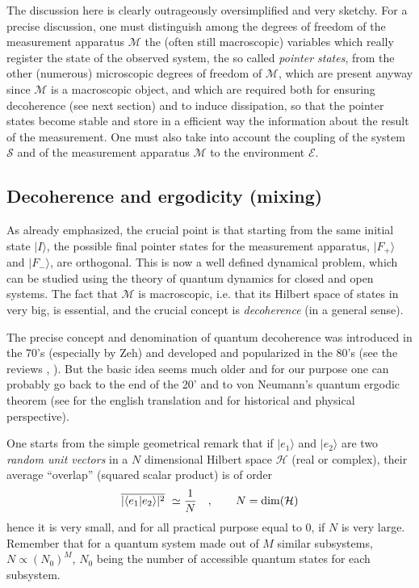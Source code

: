 The discussion here is clearly outrageously oversimplified and very sketchy. For a  precise discussion, one must distinguish among the degrees of freedom of the measurement apparatus $\mathcal{M}$ the (often still macroscopic) variables which really register the state of the observed system, the so called\emph{ pointer states}, from the other (numerous) microscopic degrees of freedom of $\mathcal{M}$, which are present anyway since $\mathcal{M}$ is a macroscopic object, and which are required both for ensuring decoherence (see next section) and to induce dissipation, so that the pointer states become stable and store in a efficient way the information about the result of the measurement. One must also take into account the coupling of the system $\mathcal{S}$ and of the measurement apparatus $\mathcal{M}$ to the environment $\mathcal{E}$.

\subsection{Decoherence and ergodicity (mixing)}
As already emphasized, the crucial point is that starting from the same initial state $|I\rangle$, the possible final pointer states for the measurement apparatus, $|F_+\rangle$ and $|F_-\rangle$, are orthogonal. 
This is now a well defined dynamical problem, which can be studied using the theory of quantum dynamics for closed and open systems. The fact that $\mathcal{M}$ is macroscopic, i.e. that its Hilbert space of states in very big, is essential, and the crucial concept is  \emph{decoherence} (in a general sense).

The precise concept and denomination of quantum decoherence was introduced in the 70's (especially by Zeh) and developed and popularized in the 80's (see the reviews
\cite{JoosZehKiefer2003}, \cite{Zurek2003}). But the basic idea seems much older and for our purpose one can probably go back to the end of the 20' and to von Neumann's 
 quantum ergodic theorem \cite{vonNeumann29} (see \cite{springerlink:10.1140/epjh/e2010-00008-5} for the english translation and \cite{GoldLebMasTumZan2010} for historical and physical perspective).

One starts from the simple geometrical remark \cite{vonNeumann29} that if $| e_1 \rangle$ and $| e_2 \rangle$ are two \emph{random 
unit vectors }in a $N$ dimensional Hilbert space $\mathcal{H}$ (real or complex), their average ``overlap'' (squared scalar product) is of order
\begin{equation}
\label{ }
\overline{|\langle e_1 | e_2 \rangle  |^2}\ \simeq {1\over N}
\quad,\qquad N=\dim (\mathcal{H})
\end{equation}
hence it is very small, and for all practical purpose equal to $0$, if $N$ is very large. Remember that for a quantum system made out of $M$ similar subsystems, $N\propto (N_0)^M$, $N_0$ being the number of accessible quantum states for each subsystem.

